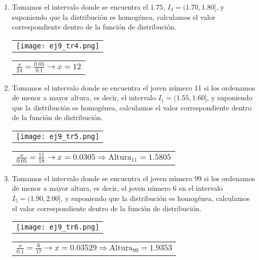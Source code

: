 \documentclass[11pt,a4paper]{article}
\theoremstyle{definition}
\begin{document}
\begin{enumerate}[label=\emph{\alph*})]
	\pagebreak
	\item Tomamos el intervalo donde se encuentra el $1.75$, $I_3 = (1.70, 1.80]$, y suponiendo que la distribución es homogénea, calculamos el valor correspondiente dentro de la función de distribución. 

\begin{table}[!htbp]
\hspace*{1.1 cm}
\begin{tabular}{c}
\texttt{[image: ej9\_tr4.png]} \\
\end{tabular}
{
\begin{tabular}{l}
$ \frac{x}{24}=\frac{0.05}{0.1} \rightarrow x = 12 $
\end{tabular}}
\end{table}

	\item Tomamos el intervalo donde se encuentra el joven número 11 si los ordenamos de menor a mayor altura, es decir, el intervalo $I_1 = (1.55,1.60]$, y suponiendo que la distribución es homogénea, calculamos el valor correspondiente dentro de la función de distribución. 

\begin{table}[!htbp]
\hspace*{1.1 cm}
\begin{tabular}{c}
\texttt{[image: ej9\_tr5.png]} \\
\end{tabular}
{
\begin{tabular}{l}
$ \frac{x}{0.05}=\frac{11}{18} \rightarrow x = 0.0305 \Rightarrow \text{Altura}_{11} = 1.5805 $

\end{tabular}}
\end{table}

	\item Tomamos el intervalo donde se encuentra el joven número 99 si los ordenamos de menor a mayor altura, es decir, el joven número 6 en el intervalo $I_5 = (1.90,2.00]$, y suponiendo que la distribución es homogénea, calculamos el valor correspondiente dentro de la función de distribución. 

\begin{table}[!htbp]
\hspace*{1.1 cm}
\begin{tabular}{c}
\texttt{[image: ej9\_tr6.png]} \\
\end{tabular}
{
\begin{tabular}{l}
$ \frac{x}{0.1}=\frac{6}{17} \rightarrow x = 0.03529 \Rightarrow \text{Altura}_{99} = 1.9353 $

\end{tabular}}
\end{table}
	\end{enumerate}
\end{document}
